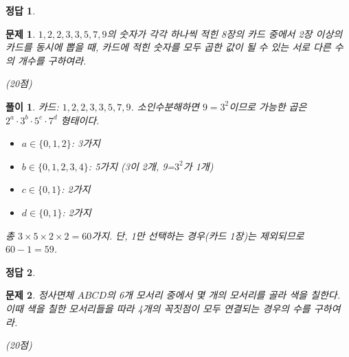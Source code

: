 \documentclass[12pt,a4paper]{article}
\theoremstyle{test_form}
\newtheorem{problem}{문제}[section]
\newtheorem*{solution}{풀이}
\newtheorem*{answer}{정답}
\begin{document}
\begin{answer}
\hfill {}
\end{answer}

\newpage

\begin{problem}
\(1,2,2,3,3,5,7,9\)의 숫자가 각각 하나씩 적힌 8장의 카드 중에서 2장 이상의 카드를 동시에 뽑을 때, 카드에 적힌 숫자를 모두 곱한 값이 될 수 있는 서로 다른 수의 개수를 구하여라.
\begin{flushright}(20점)\end{flushright}
\end{problem}

\begin{solution}
카드: \(1, 2, 2, 3, 3, 5, 7, 9\). 소인수분해하면 \(9=3^2\)이므로 가능한 곱은 \(2^a \cdot 3^b \cdot 5^c \cdot 7^d\) 형태이다.

\begin{itemize}
\item \(a \in \{0, 1, 2\}\): 3가지
\item \(b \in \{0, 1, 2, 3, 4\}\): 5가지 (3이 2개, 9=\(3^2\)가 1개)
\item \(c \in \{0, 1\}\): 2가지
\item \(d \in \{0, 1\}\): 2가지
\end{itemize}

총 \(3 \times 5 \times 2 \times 2 = 60\)가지. 단, 1만 선택하는 경우(카드 1장)는 제외되므로 \(60 - 1 = 59\).
\end{solution}

\begin{answer}
\hfill {}
\end{answer}

\newpage

\begin{problem}
정사면체 \(ABCD\)의 6개 모서리 중에서 몇 개의 모서리를 골라 색을 칠한다. 이때 색을 칠한 모서리들을 따라 4개의 꼭짓점이 모두 연결되는 경우의 수를 구하여라.
\begin{flushright}(20점)\end{flushright}
\end{problem}
\end{document}
